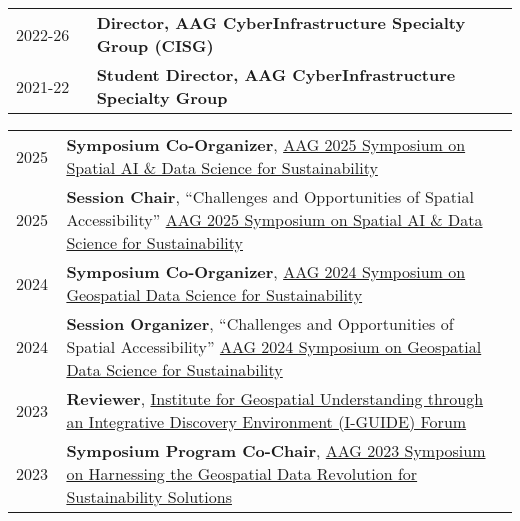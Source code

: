 \documentclass{acmcv}
\begin{document}


\vspace*{0.25cm}

    \begin{longtable}{p{0.16\linewidth} p{0.84\linewidth}}

        2022-26 & \textbf{Director, AAG CyberInfrastructure Specialty Group (CISG)} \\

        2021-22 & \textbf{Student Director, AAG CyberInfrastructure Specialty Group}
    \end{longtable}

    \begin{longtable}{p{0.1\linewidth} p{0.9\linewidth}}
        2025 & \textbf{Symposium Co-Organizer}, \href{https://i-guide.io/aag-2025-symposium-on-spatial-ai-data-science-for-sustainability/}{AAG 2025 Symposium on Spatial AI \& Data Science for Sustainability}\\

        2025 & \textbf{Session Chair}, ``Challenges and Opportunities of Spatial Accessibility'' \href{https://iguide.illinois.edu/aag-2024-symposium-on-geospatial-data-science-for-sustainability/}{AAG 2025 Symposium on Spatial AI \& Data Science for Sustainability}\\

        2024 & \textbf{Symposium Co-Organizer}, \href{https://iguide.illinois.edu/aag-2024-symposium-on-geospatial-data-science-for-sustainability/}{AAG 2024 Symposium on Geospatial Data Science for Sustainability}\\

        2024 & \textbf{Session Organizer}, ``Challenges and Opportunities of Spatial Accessibility'' \href{https://iguide.illinois.edu/aag-2024-symposium-on-geospatial-data-science-for-sustainability/}{AAG 2024 Symposium on Geospatial Data Science for Sustainability}\\
        
        2023 & \textbf{Reviewer}, \href{https://iguide.illinois.edu/forum-2023/}{Institute for Geospatial Understanding through an Integrative Discovery Environment (I-GUIDE) Forum}\\

        2023 & \textbf{Symposium Program Co-Chair}, \href{https://iguide.illinois.edu/aag-2023-symposium-on-harnessing-the-geospatial-data-revolution-for-sustainability-solutions/}{AAG 2023 Symposium on Harnessing the Geospatial Data Revolution for Sustainability Solutions}\\


\end{longtable}
\end{document}
